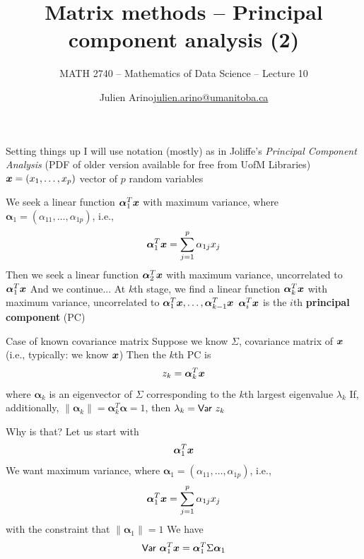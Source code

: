 \documentclass[aspectratio=169]{beamer}\usepackage[]{graphicx}\usepackage[]{xcolor}
\subtitle{MATH 2740 -- Mathematics of Data Science -- Lecture 10}
\author{\texorpdfstring{Julien Arino\newline\url{julien.arino@umanitoba.ca}}{Julien Arino}}
\institute{Department of Mathematics @ University of Manitoba}
\title{Matrix methods -- Principal component analysis (2)}
\begin{document}







\begin{frame}{Setting things up}
I will use notation (mostly) as in Joliffe's \emph{Principal Component Analysis} (PDF of older version available for free from UofM Libraries)
\vfill
$\bm{x}=(x_1,\ldots,x_p)$ vector of $p$ random variables
\end{frame}


\begin{frame} 
We seek a linear function $\bm{\alpha}_1^T\bm{x}$ with maximum variance, where $\bm{\alpha}_1=(\alpha_{11},\ldots,\alpha_{1p})$, i.e.,
\[
\bm{\alpha}_1^T\bm{x} = \sum_{j=1}^p\alpha_{1j}x_j
\]
\vfill
Then we seek a linear function $\bm{\alpha}_2^T\bm{x}$ with maximum variance, uncorrelated to $\bm{\alpha}_1^T\bm{x}$
\vfill
And we continue...
\vfill
At $k$th stage, we find a linear function $\bm{\alpha}_k^T\bm{x}$ with maximum variance, uncorrelated to $\bm{\alpha}_1^T\bm{x},\ldots,\bm{\alpha}_{k-1}^T\bm{x}$
\vfill
$\bm{\alpha}_i^T\bm{x}$ is the $i$th \textbf{principal component} (PC)
\end{frame}

\begin{frame}{Case of known covariance matrix}
Suppose we know $\Sigma$, covariance matrix of $\bm{x}$ (i.e., typically: we know $\bm{x}$)
\vfill
Then the $k$th PC is 
\[
z_k=\bm{\alpha}_k^T\bm{x}
\]
where $\bm{\alpha}_k$ is an eigenvector of $\Sigma$ corresponding to the $k$th largest eigenvalue $\lambda_k$
\vfill
If, additionally, $\|\bm{\alpha}_k\|=\bm{\alpha}_k^T\bm{\alpha}=1$, then $\lambda_k=\mathsf{Var}\  z_k$
\end{frame}


\begin{frame}{Why is that?}
Let us start with
\[
\bm{\alpha}_1^T\bm{x}
\]
\vfill
We want maximum variance, where $\bm{\alpha}_1=(\alpha_{11},\ldots,\alpha_{1p})$, i.e.,
\[
\bm{\alpha}_1^T\bm{x} = \sum_{j=1}^p\alpha_{1j}x_j
\]
with the constraint that $\|\bm{\alpha}_1\|=1$
\vfill
We have
\[
\mathsf{Var}\  \bm{\alpha}_1^T\bm{x}
=\bm{\alpha}_1^T\Sigma\bm{\alpha}_1
\]
\end{frame}
\end{document}
